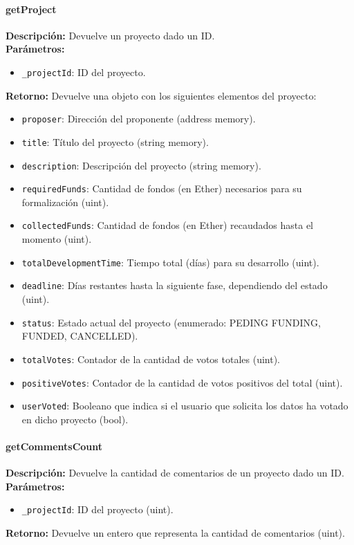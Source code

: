 \paragraph{getProject}
\noindent
\textbf{Descripción:}
Devuelve un proyecto dado un ID. \\
\textbf{Parámetros:}
\begin{itemize}
    \item \texttt{\_projectId}: ID del proyecto.
\end{itemize}
\textbf{Retorno:}
Devuelve una objeto con los siguientes elementos del proyecto:
\begin{itemize}
    \item \texttt{proposer}: Dirección del proponente (address memory).
    \item \texttt{title}: Título del proyecto (string memory).
    \item \texttt{description}: Descripción del proyecto (string memory).
    \item \texttt{requiredFunds}: Cantidad de fondos (en Ether) necesarios para su formalización (uint).
    \item \texttt{collectedFunds}: Cantidad de fondos (en Ether) recaudados hasta el momento (uint).
    \item \texttt{totalDevelopmentTime}: Tiempo total (días) para su desarrollo (uint).
    \item \texttt{deadline}: Días restantes hasta la siguiente fase, dependiendo del estado (uint).
    \item \texttt{status}: Estado actual del proyecto (enumerado: PEDING FUNDING, FUNDED, CANCELLED).
    \item \texttt{totalVotes}: Contador de la cantidad de votos totales (uint).
    \item \texttt{positiveVotes}: Contador de la cantidad de votos positivos del total (uint).
    \item \texttt{userVoted}: Booleano que indica si el usuario que solicita los datos ha votado en dicho proyecto (bool).
\end{itemize}


\paragraph{getCommentsCount}
\noindent
\textbf{Descripción:}
Devuelve la cantidad de comentarios de un proyecto dado un ID. \\
\textbf{Parámetros:}
\begin{itemize}
    \item \texttt{\_projectId}: ID del proyecto (uint).
\end{itemize}
\textbf{Retorno:}
Devuelve un entero que representa la cantidad de comentarios (uint).


